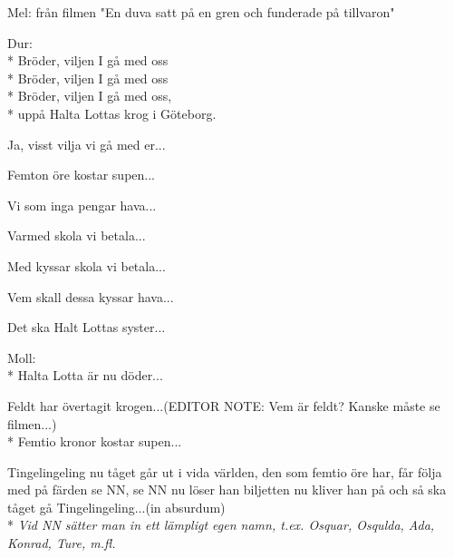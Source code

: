 \begin{SongText}
    \begin{SongInfo}
        Mel: från filmen "En duva satt på en gren och funderade på tillvaron"
    \end{SongInfo}
    \begin{SongVerse}
        Dur:\\*%
        Bröder, viljen I gå med oss\\*%
        Bröder, viljen I gå med oss\\*%
        Bröder, viljen I gå med oss,\\*%
        uppå Halta Lottas krog i Göteborg.
    \end{SongVerse}
    \begin{SongVerse}
        Ja, visst vilja vi gå med er...
    \end{SongVerse}
    \begin{SongVerse}
        Femton öre kostar supen...
    \end{SongVerse}
    \begin{SongVerse}
        Vi som inga pengar hava...
    \end{SongVerse}
    \begin{SongVerse}
        Varmed skola vi betala...
    \end{SongVerse}
    \begin{SongVerse}
        Med kyssar skola vi betala...
    \end{SongVerse}
    \begin{SongVerse}
        Vem skall dessa kyssar hava...
    \end{SongVerse}
    \begin{SongVerse}
        Det ska Halt Lottas syster...
    \end{SongVerse}
    \begin{SongVerse}
        Moll:\\*%
        Halta Lotta är nu döder...
    \end{SongVerse}
    \begin{SongVerse}
        Feldt har övertagit krogen...(EDITOR NOTE: Vem är feldt? Kanske måste se filmen...)\\*%
        Femtio kronor kostar supen...
    \end{SongVerse}
\end{SongText}
\begin{SongText}[Tingelingeling]
    \begin{SongVerse}
        Tingelingeling nu tåget går
        ut i vida världen,
        den som femtio öre har,
        får följa med på färden
        se NN, se NN
        nu löser han biljetten
        nu kliver han på
        och så ska tåget gå
        Tingelingeling...(in absurdum)\\*%
        \emph{Vid NN sätter man in ett lämpligt egen namn,
            t.ex. Osquar, Osqulda, Ada, Konrad, Ture, m.fl. }
    \end{SongVerse}
\end{SongText}
